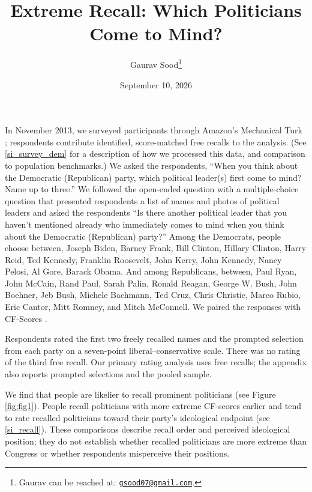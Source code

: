 \documentclass[12pt, letterpaper]{article}
\title{Extreme Recall: Which Politicians Come to Mind?\\\vspace{10mm}}
\date{September 10, 2026}
\author{Gaurav Sood\thanks{Gaurav can be reached at: \href{mailto:gsood07@gmail.com}{\texttt{gsood07@gmail.com}}.}}
\begin{document}

\maketitle

\doublespacing

In November 2013, we surveyed participants through Amazon's Mechanical Turk \citep[see][]{berinsky2012}; \scoreRespondents{} respondents contribute identified, score-matched free recalls to the analysis. (See \ref{si_survey_dem} for a description of how we processed this data, and comparison to population benchmarks.) We asked the respondents, ``When you think about the Democratic (Republican) party, which political leader(s) first come to mind? Name up to three.'' We followed the open-ended question with a multiple-choice question that presented respondents a list of names and photos of political leaders and asked the respondents ``Is there another political leader that you haven't mentioned already who immediately comes to mind when you think about the Democratic (Republican) party?'' Among the Democrats, people choose between, Joseph Biden, Barney Frank, Bill Clinton, Hillary Clinton, Harry Reid, Ted Kennedy, Franklin Roosevelt, John Kerry, John Kennedy, Nancy Pelosi, Al Gore, Barack Obama. And among Republicans, between, Paul Ryan, John McCain, Rand Paul, Sarah Palin, Ronald Reagan, George W. Bush, John Boehner, Jeb Bush, Michele Bachmann, Ted Cruz, Chris Christie, Marco Rubio, Eric Cantor, Mitt Romney, and Mitch McConnell. We paired the responses with CF-Scores \citep{bonica2013}.

Respondents rated the first two freely recalled names and the prompted selection from each party on a seven-point liberal--conservative scale. There was no rating of the third free recall. Our primary rating analysis uses free recalls; the appendix also reports prompted selections and the pooled sample.

We find that people are likelier to recall prominent politicians (see Figure \ref{fig:fig1}). People recall politicians with more extreme CF-scores earlier and tend to rate recalled politicians toward their party's ideological endpoint (see \ref{si_recall}). These comparisons describe recall order and perceived ideological position; they do not establish whether recalled politicians are more extreme than Congress or whether respondents misperceive their positions.
\end{document}
